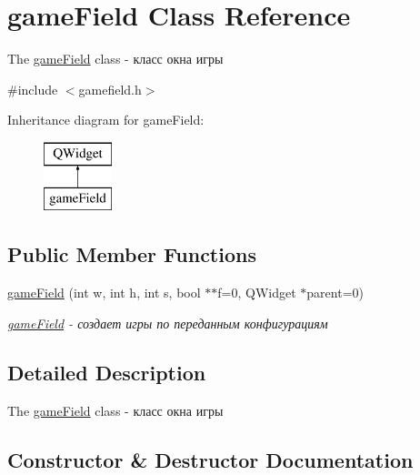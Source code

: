 \hypertarget{classgame_field}{}\section{game\+Field Class Reference}
\label{classgame_field}


The \hyperlink{classgame_field}{game\+Field} class -\/ класс окна игры  




{\ttfamily \#include $<$gamefield.\+h$>$}

Inheritance diagram for game\+Field\+:\begin{figure}[H]
\begin{center}
\leavevmode
\includegraphics[height=2.000000cm]{classgame_field}
\end{center}
\end{figure}
\subsection*{Public Member Functions}
\begin{DoxyCompactItemize}
\item 
\hyperlink{classgame_field_a05df0a3ac3527b26bad66d483014190f}{game\+Field} (int w, int h, int s, bool $\ast$$\ast$f=0, Q\+Widget $\ast$parent=0)
\begin{DoxyCompactList}\small\item\em \hyperlink{classgame_field}{game\+Field} -\/ создает игры по переданным конфигурациям \end{DoxyCompactList}\end{DoxyCompactItemize}


\subsection{Detailed Description}
The \hyperlink{classgame_field}{game\+Field} class -\/ класс окна игры 

\subsection{Constructor \& Destructor Documentation}
\hypertarget{classgame_field_a05df0a3ac3527b26bad66d483014190f}{}
